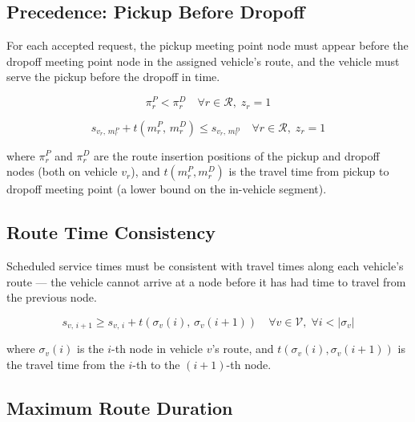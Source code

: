 \subsection*{Precedence: Pickup Before Dropoff}

For each accepted request, the pickup meeting point node must appear before the dropoff meeting
point node in the assigned vehicle's route, and the vehicle must serve the pickup before the
dropoff in time.

\begin{equation}\label{con:precedence-pos}
  \pi_r^P < \pi_r^D \quad \forall r \in \mathcal{R},\; z_r = 1
\end{equation}

\begin{equation}\label{con:precedence-time}
  s_{v_r,\, m_r^P} + t(m_r^P,\, m_r^D) \leq s_{v_r,\, m_r^D} \quad \forall r \in \mathcal{R},\; z_r = 1
\end{equation}

where $\pi_r^P$ and $\pi_r^D$ are the route insertion positions of the pickup and dropoff nodes
(both on vehicle $v_r$), and $t(m_r^P, m_r^D)$ is the travel time from pickup to dropoff
meeting point (a lower bound on the in-vehicle segment).

\subsection*{Route Time Consistency}

Scheduled service times must be consistent with travel times along each vehicle's route — the
vehicle cannot arrive at a node before it has had time to travel from the previous node.

\begin{equation}\label{con:time-consistency}
  s_{v,\, i+1} \geq s_{v,\, i} + t(\sigma_v(i),\, \sigma_v(i+1))
  \quad \forall v \in \mathcal{V},\; \forall i < |\sigma_v|
\end{equation}

where $\sigma_v(i)$ is the $i$-th node in vehicle $v$'s route, and
$t(\sigma_v(i), \sigma_v(i+1))$ is the travel time from the $i$-th to the $(i+1)$-th node.

\subsection*{Maximum Route Duration}

